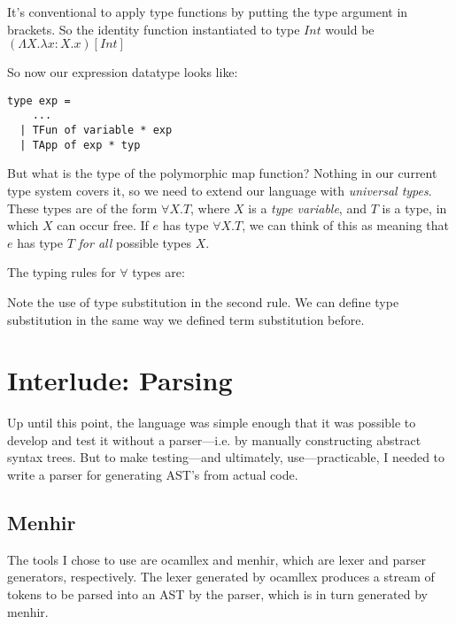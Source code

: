 \message{ !name(report.tex)}\documentclass[pageno]{jpaper}
\begin{document}
{It's conventional to apply type functions by putting the type argument in brackets.  So the identity function
instantiated to type $Int$ would be $(\Lambda X.\lambda x:X.x) [Int]$

So now our expression datatype looks like:

\begin{lstlisting}
type exp =
    ...
  | TFun of variable * exp
  | TApp of exp * typ
\end{lstlisting}

But what is the type of the polymorphic map function? Nothing in our current type system covers it, so we need to
extend our language with \textit{universal types}. These types are of the form $\forall X. T$, where
$X$ is a \textit{type variable}, and $T$ is a type, in which $X$ can occur free.  If $e$
has type $\forall X.T$, we can think of this as meaning that $e$ has type $T$ \textit{for all} possible
types $X$.

The typing rules for $\forall$ types are:

\begin{prooftree}
\end{prooftree}

\begin{prooftree}
\end{prooftree}

Note the use of type substitution in the second rule. We can define type substitution in
the same way we defined term substitution before.

\section{Interlude: Parsing}

Up until this point, the language was simple enough that it was possible to develop and test it  without a parser---i.e. by manually constructing abstract syntax trees. But to make testing---and ultimately, use---practicable, I needed to write a parser for generating AST's from actual code.

\subsection{Menhir}

The tools I chose to use
are ocamllex and menhir, which are lexer and parser generators, respectively.
The lexer generated by ocamllex produces a stream of tokens to be parsed into an AST by the parser, which is
in turn generated by menhir.

}
\end{document}

